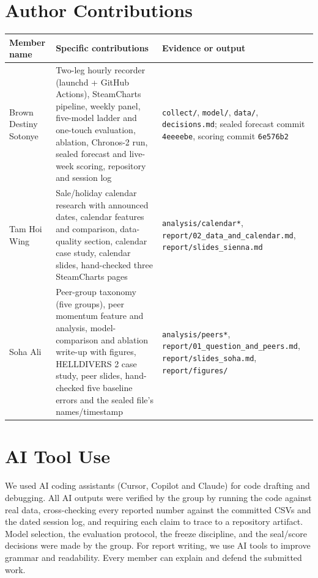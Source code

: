 \documentclass[10pt,letterpaper]{article}
\begin{document}
\section*{Author Contributions}
\begin{center}
\small
\renewcommand{\arraystretch}{1.3}
\begin{tabularx}{\linewidth}{@{} >{\raggedright\arraybackslash}p{0.95in} >{\raggedright\arraybackslash}X >{\raggedright\arraybackslash}X @{}}
\toprule
\textbf{Member name} & \textbf{Specific contributions} & \textbf{Evidence or output} \\
\midrule
Brown Destiny Sotonye & Two-leg hourly recorder (launchd + GitHub Actions), SteamCharts pipeline, weekly panel, five-model ladder and one-touch evaluation, ablation, Chronos-2 run, sealed forecast and live-week scoring, repository and session log & \texttt{collect/}, \texttt{model/}, \texttt{data/}, \texttt{decisions.md}; sealed forecast commit \texttt{4eeeebe}, scoring commit \texttt{6e576b2} \\
Tam Hoi Wing & Sale/holiday calendar research with announced dates, calendar features and comparison, data-quality section, calendar case study, calendar slides, hand-checked three SteamCharts pages & \texttt{analysis/calendar*}, \texttt{report/02\_data\_and\_calendar.md}, \texttt{report/slides\_sienna.md} \\
Soha Ali & Peer-group taxonomy (five groups), peer momentum feature and analysis, model-comparison and ablation write-up with figures, HELLDIVERS 2 case study, peer slides, hand-checked five baseline errors and the sealed file's names/timestamp & \texttt{analysis/peers*}, \texttt{report/01\_question\_and\_peers.md}, \texttt{report/slides\_soha.md}, \texttt{report/figures/} \\
\bottomrule
\end{tabularx}
\end{center}

\section*{AI Tool Use}
We used AI coding assistants (Cursor, Copilot and Claude) for code drafting and  debugging. All AI outputs were verified by the group by running the code against real data, cross-checking every reported number against the committed CSVs and the dated session log, and requiring each claim to trace to a repository artifact. Model selection, the evaluation protocol, the freeze discipline, and the seal/score decisions were made by the group. For report writing, we use AI tools to improve grammar and readability. Every member can explain and defend the submitted work.
\end{document}
